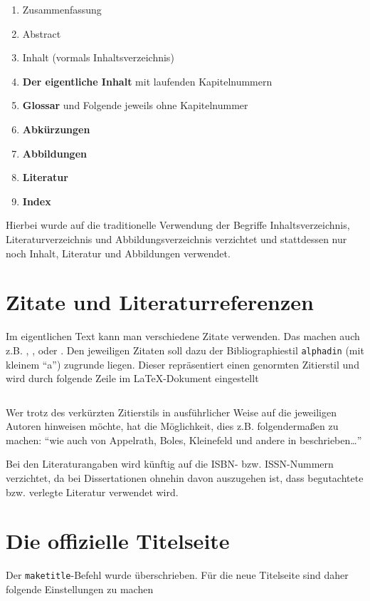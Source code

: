 \begin{enumerate}
\item Zusammenfassung
\item Abstract
\item Inhalt (vormals Inhaltsverzeichnis)
\item \textbf{Der eigentliche Inhalt} mit laufenden Kapitelnummern
\item \textbf{Glossar} und Folgende jeweils ohne Kapitelnummer
\item \textbf{Abk\"{u}rzungen}
\item \textbf{Abbildungen}
\item \textbf{Literatur}
\item \textbf{Index}
\end{enumerate}


Hierbei wurde auf die traditionelle Verwendung der Begriffe
Inhaltsverzeichnis, Literaturverzeichnis und Abbildungsverzeichnis
verzichtet und stattdessen nur noch Inhalt, Literatur und
Abbildungen verwendet.


\section{Zitate und Literaturreferenzen}
Im eigentlichen Text kann man verschiedene Zitate verwenden. Das
machen auch z.B. \cite{abel03}, \cite{appelrath06}, \cite{back01}
oder \cite{bakos91}. Den jeweiligen Zitaten soll dazu der
Bibliographiestil \texttt{alphadin} (mit kleinem "`a"') zugrunde
liegen. Dieser repr\"{a}sentiert einen genormten Zitierstil und wird
durch folgende Zeile im \LaTeX-Dokument eingestellt

\begin{verbatim}

\end{verbatim}

Wer trotz des verk\"{u}rzten Zitierstils in ausf\"{u}hrlicher Weise auf
die jeweiligen Autoren hinweisen m\"{o}chte, hat die M\"{o}glichkeit, dies
z.B. folgenderma{\ss}en zu machen: "`wie auch von Appelrath, Boles,
Kleinefeld und andere in
\cite{appelrath06} beschrieben\ldots"'

Bei den Literaturangaben wird k\"{u}nftig auf die ISBN- bzw.
ISSN-Nummern verzichtet, da bei Dissertationen ohnehin davon
auszugehen ist, dass begutachtete bzw. verlegte Literatur
verwendet wird.


\section{Die offizielle Titelseite}
Der \texttt{maketitle}-Befehl wurde \"{u}berschrieben. F\"{u}r die neue Titelseite
sind daher folgende Einstellungen zu machen

